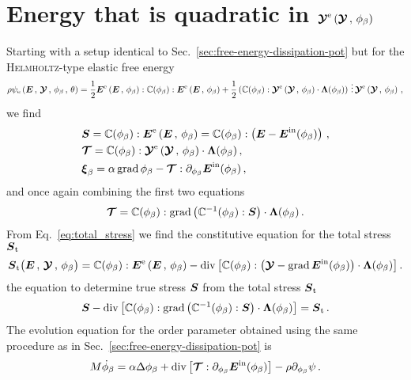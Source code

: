 \documentclass[preprint,review,3p,times,authoryear]{elsarticle}
\begin{document}
\section{Energy that is quadratic in $\boldsymbol{\mathcal{Y}}^{\text{e}}\left(\boldsymbol{\mathcal{Y}}\,,\,\phi_{\beta}\right)$}
\label{sec:why-Ye-is-bad}
%
Starting with a setup identical to Sec.~\ref{sec:free-energy-dissipation-pot} but for the \textsc{Helmholtz}-type elastic free energy
\begin{equation}
  \label{eq:helmholtz_type_Ye}
  \rho\psi_{\ue}\left( \tE\,,\,\ttY\,,\,\phi_{\beta}\,,\,\theta \right) =
  \half \tEe : \bbC(\phi_{\beta}) : \tEe
  + \half \left( \bbC(\phi_{\beta}):\ttYe\cdot\tLcore \right) \tridot \ttYe\,,
\end{equation}
we find
\begin{align}
  \label{eq:laws_of_state_S_Ye}
  & \tS  = \bbC(\phi_{\beta}) : \tEe = \bbC(\phi_{\beta}) : \left( \tE - \tEtr \right) \,,\\
    \label{eq:laws_of_state_HOS_Ye}
  &  \ttT = \bbC(\phi_{\beta}):\ttYe\cdot\tLcore\,,\\
     \label{eq:laws_of_state_OP_Ye}
  & \vxi_{\beta} = \alpha\grad\phi_{\beta} - \ttT:\pder{\tEtr}{\phi_{\beta}}\,,
\end{align}
and once again combining the first two equations
\begin{align}
  \boldsymbol{\mathcal{T}} = \mathbb{C}(\phi_{\beta}):\operatorname*{grad}{\left(\mathbb{C}^{-1}(\phi_{\beta}):\boldsymbol{S}\right)}\cdot\boldsymbol{\Lambda{}}(\phi_{\beta})\,.
\end{align}
From Eq.~\eqref{eq:total_stress} we find the  constitutive equation for the total stress $\boldsymbol{S}_{\text{t}}$
\begin{equation}
  \label{eq:const_St_Ye}
  \tSt\bigl( \tE\,,\, \ttY\,,\, \phi_{\beta} \bigr) = \bbC(\phi_{\beta}):\tEe - \diver{\left[ \bbC(\phi_{\beta}):\bigl( \ttY - \grad{\tEtr} \bigr)\cdot\tLcore\right]}\,.
\end{equation}
the equation to determine true stress $\boldsymbol{S}$ from the total stress $\boldsymbol{S}_{\text{t}}$
\begin{equation}
  \label{eq:total_stress_S_Ye}
  \tS -\diver{\left[  \bbC(\phi_{\beta}):\grad{\left(\bbC^{-1}(\phi_{\beta}):\tS\right)}\cdot\tLcore \right]} = \tSt\,.
\end{equation}
The evolution equation for the order parameter obtained using the same procedure as in Sec.~\ref{sec:free-energy-dissipation-pot} is
\begin{equation}
  \label{eq:AC_equation_Ye}
  M\sdot\phi_{\beta} = \alpha\Delta\phi_{\beta} + \diver{\left[\ttT:\pder{\tEtr}{\phi_{\beta}}\right]} -  \rho\pder{\psi}{\phi_{\beta}}\,.
\end{equation}
\end{document}
